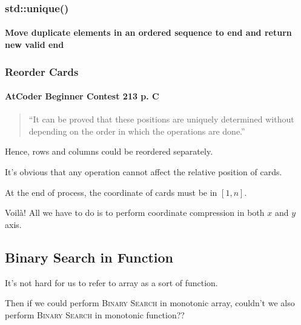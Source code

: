 \documentclass{beamer}
\begin{document}

\frame
{
	\frametitle{\ttfamily std::unique()}
	\framesubtitle{Move duplicate elements in an ordered sequence to end and return new valid end}
	
	
}

\frame
{
	\frametitle{Reorder Cards}
	\framesubtitle{AtCoder Beginner Contest 213 p. C}
	
	\begin{quote}
		``It can be proved that these positions are uniquely determined without depending on the order in which the operations are done.''
	\end{quote}
	
	\pause
	
	Hence, rows and columns could be reordered separately.\pause
	
	It's obvious that any operation cannot affect the relative position of cards.\pause
	
	At the end of process, the coordinate of cards must be in $[1, n]$.\pause
	
	Voil\`{a}! All we have to do is to perform coordinate compression in both $x$ and $y$ axis.
}

\subsection{Binary Search in Function}

\frame
{
	It's not hard for us to refer to array as a sort of function.\pause
	
	Then if we could perform \textsc{Binary Search} in monotonic array, couldn't we also perform \textsc{Binary Search} in monotonic function??
}
\end{document}
